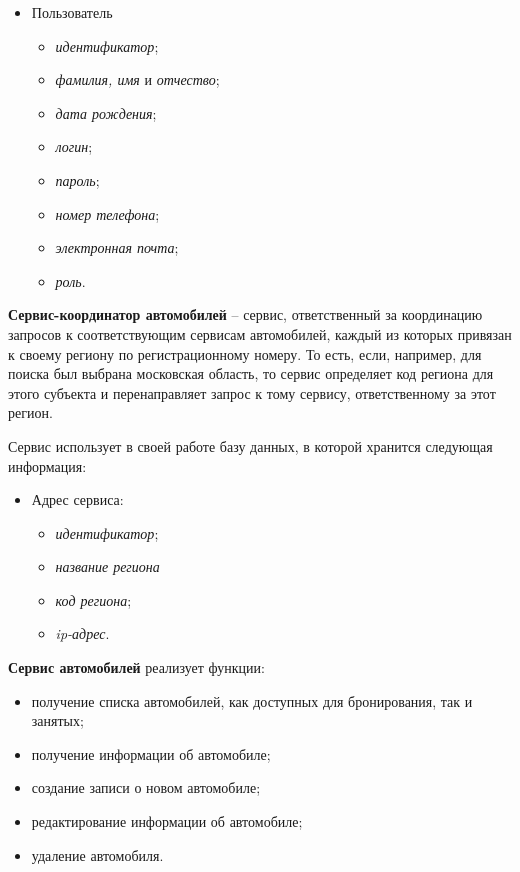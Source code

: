 \begin{itemize}
	\item Пользователь
	\begin{itemize}
		\item \textit{идентификатор};
		\item \textit{фамилия, имя} и \textit{отчество};
		\item \textit{дата рождения};
		\item \textit{логин};
		\item \textit{пароль};
		\item \textit{номер телефона};
		\item \textit{электронная почта};
		\item \textit{роль}.
	\end{itemize}
\end{itemize}

\textbf{Сервис-координатор автомобилей} -- сервис, ответственный за координацию запросов к соответствующим сервисам автомобилей, каждый из которых привязан к своему региону по регистрационному номеру. То есть, если, например, для поиска был выбрана московская область, то сервис определяет код региона для этого субъекта и перенаправляет запрос к тому сервису, ответственному за этот регион.

Сервис использует в своей работе базу данных, в которой хранится следующая информация:

\begin{itemize}
	\item Адрес сервиса:
	\begin{itemize}
		\item \textit{идентификатор};
		\item \textit{название региона}
		\item \textit{код региона};
		\item \textit{ip-адрес}.
	\end{itemize}
\end{itemize}

\textbf{Сервис автомобилей} реализует функции:
\begin{itemize}
	\item получение списка автомобилей, как доступных для бронирования, так и занятых;
	
	\item получение информации об автомобиле;
	
	\item создание записи о новом автомобиле;
	
	\item редактирование информации об автомобиле;
	
	\item удаление автомобиля.
\end{itemize}

